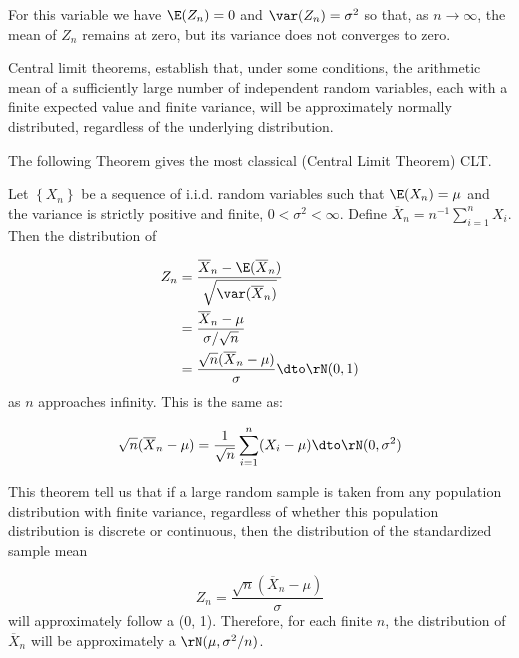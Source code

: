 \documentclass[english,12pt]{book}\usepackage[]{graphicx}\usepackage[]{xcolor}
\begin{document}
For this variable we have $\E(Z_n) = 0$ and $\var(Z_n) = \sigma^2$ so that, as $n\to \infty$, the mean of $Z_n$ remains at zero, but its variance does not converges to zero. 


Central limit theorems, establish that, under some conditions, the arithmetic mean of a sufficiently large number of independent random variables, each with a finite expected value and finite variance, will be approximately normally distributed, regardless of the underlying distribution. 

The following Theorem gives the most classical (Central Limit Theorem) CLT. 


\begin{theorem}\label{theorem:LL_CLT_U}
Let $\left\lbrace X_n \right\rbrace$ be a sequence of i.i.d. random variables such that $\E(X_n) = \mu$ and the variance is strictly positive and finite, $0 < \sigma^2 < \infty$. Define $\overline{X}_n = n^{-1}\sum_{i = 1}^nX_i$. Then the distribution of

\begin{equation*}
  \begin{aligned}
      Z_n & = \frac{\overline{X}_n  - \E(\overline{X}_n)}{\sqrt{\var(\overline{X}_n)}} \\
          & = \frac{\overline{X}_n - \mu}{\sigma / \sqrt{n}} \\
      & = \frac{\sqrt{n}(\overline{X}_n - \mu)}{\sigma} \dto \rN(0, 1)
  \end{aligned}
\end{equation*}
%
as $n$ approaches infinity. This is the same as:
 
 
 \begin{equation*}
  \sqrt{n}(\overline{X}_n - \mu) = \frac{1}{\sqrt{n}}\sum_{i = 1}^n(X_i - \mu)\dto \rN(0, \sigma^2)
 \end{equation*}
\end{theorem}

This theorem tell us that if a large random sample is taken from any population distribution with finite variance, regardless of whether this population distribution is discrete or continuous, then the distribution of the standardized sample mean

\begin{equation*}
Z_n = \frac{\sqrt{n}(\overline{X}_n - \mu)}{\sigma}
\end{equation*}
%
will approximately follow a \rN(0, 1). Therefore, for each finite $n$, the distribution of $\overline{X}_n$ will be approximately a $\rN(\mu, \sigma^2/n)$.\\
\end{document}
